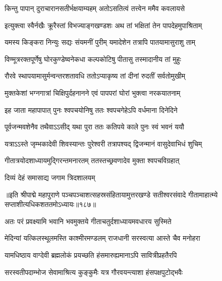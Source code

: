 \twolineshloka
{किन्तु पापान् दुराचारानसतीर्भक्षयाम्यहम्}
{अतोऽसतित्वं तत्त्वेन ममैव कवलायसे} %

\twolineshloka
{इत्युक्त्वा स्वैर्नखैः क्रूरैस्तां विभज्याङ्गखण्डशः}
{अथ तां भक्षितां तेन पापदेहमुपाश्रिताम्} %

\twolineshloka
{यमस्य किङ्करा निन्युः सद्यः संयमनीं पुरीम्}
{यमादेशेन तत्रापि पातयामासुराशु ताम्} %

\twolineshloka
{विण्मूत्ररक्तपूर्णेषु घोरकुण्डेष्वनेकधा}
{कल्पकोटिषु पीतासु तस्मादानीय तां मुहुः} %

\twolineshloka
{रौरवे स्थापयामासुर्मन्वन्तरशतावधि}
{ततोऽप्याकृष्य तां दीनां रुदतीं सर्वतोमुखीम्} %

\twolineshloka
{मुक्तकेशां भग्नगात्रां चिक्षिपुर्दहनानने}
{एवं पापपरां घोरां भुक्त्वा नरकयातनाम्} %

\twolineshloka
{इह जाता महापापात् पुनः श्वपचयोनिषु}
{ततः श्वपचगेहेऽपि वर्धमाना दिनेदिने} %

\twolineshloka
{पूर्वजन्मवशेनैव तथैवाऽऽसीद् यथा पुरा}
{ततः कतिपये काले पुनः स्वं भवनं ययौ} %

\twolineshloka
{यत्राऽऽस्ते जृम्भकादेवी शिवस्यान्तः पुरेश्वरी}
{तत्रापश्यद् द्विजन्मानं वासुदेवाभिधं शुचिम्} %

\twolineshloka
{गीतात्रयोदशाध्यायमुद्गिरन्तमनारतम्}
{ततस्तच्छ्रवणादेव मुक्ता श्वपचविग्रहात्} %

\onelineshloka
{दिव्यं देहं समासाद्य जगाम त्रिदशालयम्} %

॥इति श्रीपाद्मे महापुराणे पञ्चपञ्चाशत्सहस्रसंहितायामुत्तरखण्डे सतीश्वरसंवादे गीतामाहात्म्ये सप्ताशीत्यधिकशततमोऽध्यायः॥१८७॥

\genMangalaShloka

\closesub

\ganapatyadiDhyanam
\padmaPuranam



\twolineshloka
{अतः परं प्रवक्ष्यामि भवानि भवमुक्तये}
{गीताचतुर्दशाध्यायमवधारय सुस्मिते} %

\twolineshloka
{मेदिन्यां यत्किलस्थूलमस्ति काश्मीरमण्डलम्}
{राजधानी सरस्वत्या आस्ते चैव मनोहरा} %

\twolineshloka
{यामधिष्ठाय वाग्देवी ब्रह्मलोकं प्रयच्छति}
{हंसमारुह्यमानाऽपि सावित्रीप्रहतैरपि} %

\twolineshloka
{सरस्वतीपदाम्भोज सेवामाश्रित्य कुङ्कुमैः}
{यत्र गौरवयन्त्याशा हंसपक्षपुटोद्भवैः} %

